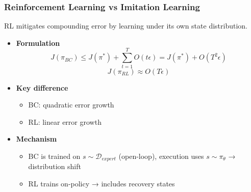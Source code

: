 \documentclass[11pt,aspectratio=169,xcolor={dvipsnames},usepdftitle=false]{beamer}
\begin{document}
\begin{frame}
\frametitle{Reinforcement Learning vs Imitation Learning}
RL mitigates compounding error by learning under its own state distribution.
\begin{itemize}

	\item \textbf{Formulation}
        $$
        J(\pi_{BC}) \le J(\pi^*) + \sum_{t=1}^{T} O(t\epsilon) = J(\pi^*) + O(T^2 \epsilon)
        $$
        $$
        J(\pi_{RL}) \approx O(T \epsilon)
        $$
	\item \textbf{Key difference}

	\begin{itemize}
		\item BC: quadratic error growth
		\item RL: linear error growth
	\end{itemize}

	\item \textbf{Mechanism}

	\begin{itemize}
		\item BC is trained on $s \sim \mathcal{D}_{expert}$ (open-loop), execution uses $s \sim \pi_\theta$ → distribution shift
		\item RL trains on-policy → includes recovery states
	\end{itemize}

\end{itemize}

\end{frame}
\end{document}
